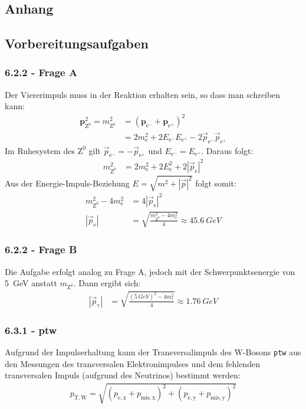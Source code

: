 \documentclass[11pt, a4paper]{article}
\numberwithin{equation}{section}
\begin{document}
\begin{appendix}
\newpage
\section{Anhang}
\subsection{Vorbereitungsaufgaben}

\subsubsection*{6.2.2 - Frage A}
Der Viererimpuls muss in der Reaktion erhalten sein, so dass man schreiben kann:
\begin{align*}
	\mathbf{p}_{\mathrm{Z}^0}^2=m_{\mathrm{Z}^0}^2&=(\mathbf{p}_{\mathrm{e}^-}+\mathbf{p}_{\mathrm{e}^+})^2\\
	&=2m^2_{\mathrm{e}} + 2 E_{\mathrm{e}^-} E_{\mathrm{e}^+} - 2\vec{p}_{\mathrm{e}^-}\vec{p}_{\mathrm{e}^+}
\end{align*}
Im Ruhesystem des $\mathrm{Z}^0$ gilt $\vec{p}_{\mathrm{e}^-}=-\vec{p}_{\mathrm{e}^+}$ und $E_{\mathrm{e}^-}=E_{\mathrm{e}^+}$. Daraus folgt:
\begin{align*}
	m_{\mathrm{Z}^0}^2&=2m^2_{\mathrm{e}} + 2 E_{\mathrm{e}}^2 + 2|\vec{p}_{\mathrm{e}}|^2
\end{align*}
Aus der Energie-Impuls-Beziehung $E=\sqrt{m^2+|\vec{p}|^2}$ folgt somit:
\begin{align*}
	m_{\mathrm{Z}^0}^2 - 4m^2_{\mathrm{e}} &= 4|\vec{p}_{\mathrm{e}}|^2\\
	|\vec{p}_{\mathrm{e}}|&=\sqrt{\frac{m_{\mathrm{Z}^0}^2 - 4m^2_{\mathrm{e}}}{4}} \approx \SI{45.6}{GeV}
\end{align*}

\subsubsection*{6.2.2 - Frage B}
Die Aufgabe erfolgt analog zu Frage A, jedoch mit der Schwerpunktsenergie von \SI{5}{GeV} anstatt $m_{\mathrm{Z}^0}$. Dann ergibt sich:
\begin{align*}
	|\vec{p}_{\mathrm{\tau}}|&=\sqrt{\frac{(\SI{5}{GeV})^2 - 4m^2_{\mathrm{\tau}}}{4}} \approx \SI{1.76}{GeV}
\end{align*}

\subsubsection*{6.3.1 - ptw}
Aufgrund der Impulserhaltung kann der Transversalimpuls des W-Bosons \texttt{ptw} aus den Messungen des transversalen Elektronimpulses und dem fehlenden transversalen Impuls (aufgrund des Neutrinos) bestimmt werden:
\begin{align*}
	p_\mathrm{T,W}=\sqrt{(p_\mathrm{e,x} + p_\mathrm{mis, x})^2 + (p_\mathrm{e,y} + p_\mathrm{mis, y})^2}
\end{align*}


\end{appendix}
\end{document}
